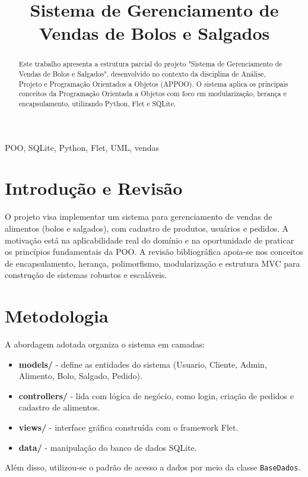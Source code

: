 \documentclass[conference]{IEEEtran}
\begin{document}
\title{Sistema de Gerenciamento de Vendas de Bolos e Salgados}

\author{
}

\maketitle

\begin{abstract}
Este trabalho apresenta a estrutura parcial do projeto "Sistema de Gerenciamento de Vendas de Bolos e Salgados", desenvolvido no contexto da disciplina de Análise, Projeto e Programação Orientados a Objetos (APPOO). O sistema aplica os principais conceitos da Programação Orientada a Objetos com foco em modularização, herança e encapsulamento, utilizando Python, Flet e SQLite.
\end{abstract}

\begin{IEEEkeywords}
POO, SQLite, Python, Flet, UML, vendas
\end{IEEEkeywords}

\section{Introdução e Revisão}
O projeto visa implementar um sistema para gerenciamento de vendas de alimentos (bolos e salgados), com cadastro de produtos, usuários e pedidos. A motivação está na aplicabilidade real do domínio e na oportunidade de praticar os princípios fundamentais da POO. A revisão bibliográfica apoia-se nos conceitos de encapsulamento, herança, polimorfismo, modularização e estrutura MVC para construção de sistemas robustos e escaláveis.

\section{Metodologia}
A abordagem adotada organiza o sistema em camadas:
\begin{itemize}
    \item \textbf{models/} - define as entidades do sistema (Usuario, Cliente, Admin, Alimento, Bolo, Salgado, Pedido).
    \item \textbf{controllers/} - lida com lógica de negócio, como login, criação de pedidos e cadastro de alimentos.
    \item \textbf{views/} - interface gráfica construída com o framework Flet.
    \item \textbf{data/} - manipulação do banco de dados SQLite.
\end{itemize}
Além disso, utilizou-se o padrão de acesso a dados por meio da classe \texttt{BaseDados}.
\end{document}
